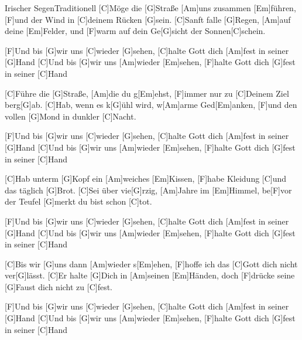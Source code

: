 \documentclass[../main.tex]{subfiles}
\begin{document}
\begin{song}{Irischer Segen}{Traditionell}{}
[C]Möge die [G]Straße  [Am]uns zusammen [Em]führen,
[F]und der Wind in [C]deinem Rücken [G]sein.
[C]Sanft falle [G]Regen, [Am]auf deine [Em]Felder,
und [F]warm auf dein Ge[G]sicht der Sonnen[C]schein.

[F]Und bis [G]wir uns [C]wieder [G]sehen, [C]halte Gott dich [Am]fest in seiner [G]Hand
[C]Und bis [G]wir uns [Am]wieder [Em]sehen, [F]halte Gott dich [G]fest in seiner [C]Hand

[C]Führe die [G]Straße, [Am]die du g[Em]ehst,
[F]immer nur zu [C]Deinem Ziel berg[G]ab.
[C]Hab, wenn es k[G]{ü}hl wird, w[Am]arme Ged[Em]anken,
[F]und den vollen [G]Mond in dunkler [C]Nacht.

[F]Und bis [G]wir uns [C]wieder [G]sehen, [C]halte Gott dich [Am]fest in seiner [G]Hand
[C]Und bis [G]wir uns [Am]wieder [Em]sehen, [F]halte Gott dich [G]fest in seiner [C]Hand

[C]Hab unterm [G]Kopf ein [Am]weiches [Em]Kissen,
[F]habe Kleidung [C]und das täglich [G]Brot.
[C]Sei über vie[G]rzig, [Am]Jahre im [Em]Himmel,
be[F]vor der Teufel [G]merkt du bist schon [C]tot.

[F]Und bis [G]wir uns [C]wieder [G]sehen, [C]halte Gott dich [Am]fest in seiner [G]Hand
[C]Und bis [G]wir uns [Am]wieder [Em]sehen, [F]halte Gott dich [G]fest in seiner [C]Hand

[C]Bis wir [G]uns dann [Am]wieder s[Em]ehen,
[F]hoffe ich das [C]Gott dich nicht ver[G]lässt.
[C]Er halte [G]Dich in [Am]seinen [Em]Händen,
doch [F]drücke seine [G]Faust dich nicht zu [C]fest.

[F]Und bis [G]wir uns [C]wieder [G]sehen, [C]halte Gott dich [Am]fest in seiner [G]Hand
[C]Und bis [G]wir uns [Am]wieder [Em]sehen, [F]halte Gott dich [G]fest in seiner [C]Hand
\end{song}
\end{document}
